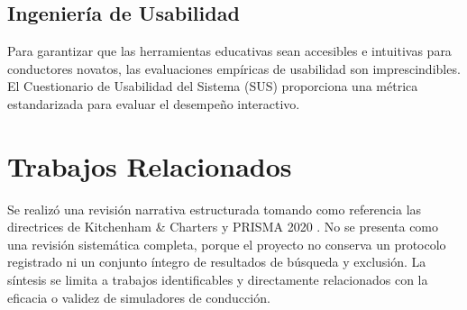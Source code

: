 \documentclass[11pt,a4paper]{report}
\begin{document}
\section{Ingeniería de Usabilidad}
Para garantizar que las herramientas educativas sean accesibles e intuitivas para conductores novatos, las evaluaciones empíricas de usabilidad son imprescindibles. El Cuestionario de Usabilidad del Sistema (SUS) \cite{brooke1996sus} proporciona una métrica estandarizada para evaluar el desempeño interactivo.

\chapter{Trabajos Relacionados}
Se realizó una revisión narrativa estructurada tomando como referencia las directrices de Kitchenham \& Charters \cite{kitchenham2007guidelines} y PRISMA 2020 \cite{page2021prisma}. No se presenta como una revisión sistemática completa, porque el proyecto no conserva un protocolo registrado ni un conjunto íntegro de resultados de búsqueda y exclusión. La síntesis se limita a trabajos identificables y directamente relacionados con la eficacia o validez de simuladores de conducción.
\end{document}
